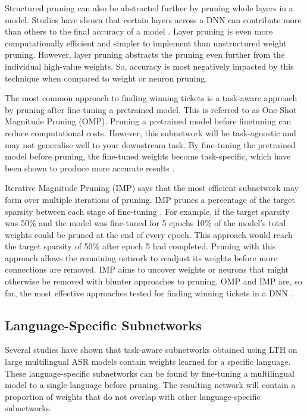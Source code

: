 Structured pruning can also be abstracted further by pruning whole layers in a model. Studies have shown that certain layers across a DNN can contribute more than others to the final accuracy of a model \cite{gromov2024unreasonable}. Layer pruning is even more computationally efficient and simpler to implement than unstructured weight pruning. However, layer pruning abstracts the pruning even further from the individual high-value weights. So, accuracy is most negatively impacted by this technique when compared to weight or neuron pruning.

The most common approach to finding winning tickets is a task-aware approach by pruning after fine-tuning a pretrained model. This is referred to as One-Shot Magnitude Pruning (OMP). Pruning a pretrained model before finetuning can reduce computational costs. However, this subnetwork will be task-agnostic and may not generalise well to your downstream task. By fine-tuning the pretrained model before pruning, the fine-tuned weights become task-specific, which have been shown to produce more accurate results \cite{frankle2018LTH, PARP}.

Iterative Magnitude Pruning (IMP) says that the most efficient subnetwork may form over multiple iterations of pruning. IMP prunes a percentage of the target sparsity between each stage of fine-tuning \cite{frankle2018LTH}. For example, if the target sparsity was 50\% and the model was fine-tuned for 5 epochs 10\% of the model's total weights could be pruned at the end of every epoch. This approach would reach the target sparsity of 50\% after epoch 5 had completed. Pruning with this approach allows the remaining network to readjust its weights before more connections are removed. IMP aims to uncover weights or neurons that might otherwise be removed with blunter approaches to pruning. OMP and IMP are, so far, the most effective approaches tested for finding winning tickets in a DNN \cite{frankle2018LTH, liu2018rethinking, You2020Drawing, PARP}.

\subsection{Language-Specific Subnetworks}
Several studies have shown that task-aware subnetworks obtained using LTH on large multilingual ASR models contain weights learned for a specific language. These language-specific subnetworks can be found by fine-tuning a multilingual model to a single language before pruning. The resulting network will contain a proportion of weights that do not overlap with other language-specific subnetworks. 

